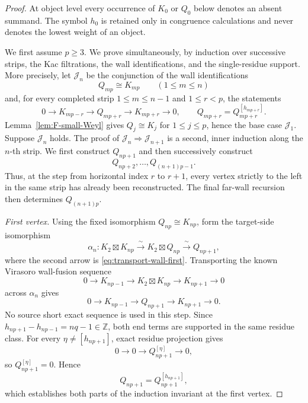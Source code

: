 \documentclass[12pt,leqno]{amsart}
\numberwithin{equation}{section}
\def\Z{\mathbb{Z}}
\begin{document}
\begin{proof}
At object level every occurrence of $K_0$ or $Q_0$ below denotes an absent
summand.  The symbol $h_0$ is retained only in congruence calculations and
never denotes the lowest weight of an object.

We first assume $p\ge3$.  We prove simultaneously, by induction over
successive strips, the Kac filtrations, the wall identifications, and the
single-residue support.  More precisely, let $\mathcal J_n$ be the conjunction of the wall
identifications
\[
 Q_{mp}\cong K_{mp}\qquad(1\le m\le n)
\]
and, for every completed strip $1\le m\le n-1$ and $1\le r<p$, the
statements
\[
 0\to K_{mp-r}\to Q_{mp+r}\to K_{mp+r}\to0,
 \qquad
 Q_{mp+r}=Q_{mp+r}^{[h_{mp+r}]}.
\]
Lemma~\ref{lem:F-small-Weyl} gives $Q_j\cong K_j$ for $1\le j\le p$, hence
the base case $\mathcal J_1$.  Suppose $\mathcal J_n$ holds.  The proof of
$\mathcal J_n\Rightarrow\mathcal J_{n+1}$ is a second, inner induction
along the $n$-th strip.  We first construct $Q_{np+1}$ and then successively
construct
\[
 Q_{np+2},\ldots,Q_{(n+1)p-1}.
\]
Thus, at the step from horizontal index $r$ to $r+1$, every vertex strictly
to the left in the same strip has already been reconstructed.  The final
far-wall recursion then determines $Q_{(n+1)p}$.

\smallskip
\noindent\emph{First vertex.}
Using the fixed isomorphism $Q_{np}\cong K_{np}$, form the target-side
isomorphism
\[
 \alpha_n:
 K_2\boxtimes K_{np}
 \xrightarrow{\ \sim\ }
 K_2\boxtimes Q_{np}
 \xrightarrow{\ \sim\ }
 Q_{np+1},
\]
where the second arrow is \eqref{eq:transport-wall-first}.  Transporting
the known Virasoro wall-fusion sequence
\[
 0\longrightarrow K_{np-1}\longrightarrow
 K_2\boxtimes K_{np}\longrightarrow K_{np+1}\longrightarrow0
\]
across $\alpha_n$ gives
\[
 0\longrightarrow K_{np-1}\longrightarrow Q_{np+1}
 \longrightarrow K_{np+1}\longrightarrow0.
\]
No source short exact sequence is used in this step.
Since $h_{np+1}-h_{np-1}=nq-1\in\Z$, both end terms are supported in the
same residue class.  For every $\eta\ne[h_{np+1}]$, exact residue
projection gives
\[
 0\longrightarrow0\longrightarrow Q_{np+1}^{[\eta]}\longrightarrow0,
\]
so $Q_{np+1}^{[\eta]}=0$.  Hence
\[
 Q_{np+1}=Q_{np+1}^{[h_{np+1}]},
\]
which establishes both parts of the induction invariant at the first
vertex.


\end{proof}
\end{document}
